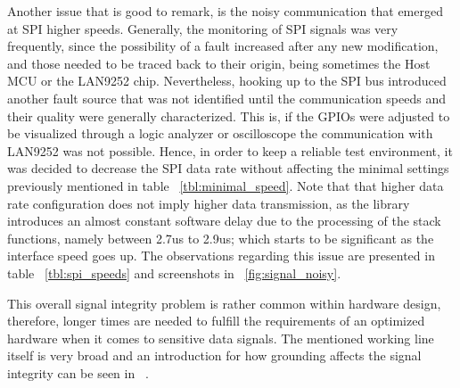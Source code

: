 Another issue that is good to remark, is the noisy communication that emerged at SPI higher speeds. Generally, the monitoring of SPI
signals was very frequently, since the possibility of a fault increased after any new modification, and those needed to be 
traced back to their origin, being sometimes the Host MCU or the LAN9252 chip. Nevertheless, hooking up to the SPI bus introduced another
fault source that was not identified until the communication speeds and their quality were generally characterized. This is, if the GPIOs were 
adjusted to be visualized through a logic analyzer or oscilloscope the communication with LAN9252 was not possible. Hence, 
in order to keep a reliable test environment, it was decided to decrease the SPI data rate without affecting the minimal 
settings 
previously mentioned in table ~\ref{tbl:minimal_speed}. Note that that higher data rate configuration does not imply higher data transmission, as 
the library introduces an almost constant software delay due to the processing of the stack functions, 
namely between 2.7us to 2.9us; which starts to be significant as the interface speed goes up. 
The observations regarding this issue are presented in table ~\ref{tbl:spi_speeds} and screenshots in ~\ref{fig:signal_noisy}. 

This overall signal integrity problem is rather common within hardware design, therefore, longer times are needed to 
fulfill the requirements
of an optimized hardware when it comes to sensitive data signals. The mentioned working line itself is very broad and 
an introduction for how grounding affects the signal integrity can be seen in ~\cite{pcb_design_grounding}.%


